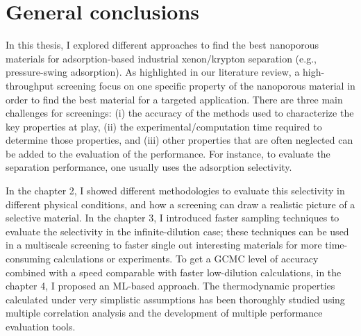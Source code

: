 
\chapter*{General conclusions}

In this thesis, I explored different approaches to find the best nanoporous materials for adsorption-based industrial xenon/krypton separation (e.g., pressure-swing adsorption). As highlighted in our literature review, a high-throughput screening focus on one specific property of the nanoporous material in order to find the best material for a targeted application. There are three main challenges for screenings: (i) the accuracy of the methods used to characterize the key properties at play, (ii) the experimental/computation time required to determine those properties, and (iii) other properties that are often neglected can be added to the evaluation of the performance. For instance, to evaluate the separation performance, one usually uses the adsorption selectivity. 

In the chapter 2, I showed different methodologies to evaluate this selectivity in different physical conditions, and how a screening can draw a realistic picture of a selective material. In the chapter 3, I introduced faster sampling techniques to evaluate the selectivity in the infinite-dilution case; these techniques can be used in a multiscale screening to faster single out interesting materials for more time-consuming calculations or experiments. To get a GCMC level of accuracy combined with a speed comparable with faster low-dilution calculations, in the chapter 4, I proposed an ML-based approach. The thermodynamic properties calculated under very simplistic assumptions has been thoroughly studied using multiple correlation analysis and the development of multiple performance evaluation tools.

